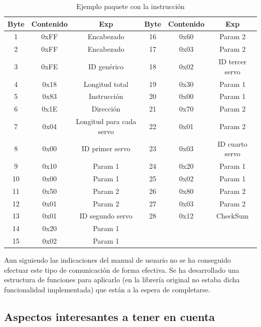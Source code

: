 		\begin{table}[htbp]
			\caption{Ejemplo paquete con la instrucción }
			\label{tab:syncwrite_paquet}
		 \begin{center}
				 	\begin{tabular}{|c|c|c||c|c|c|}

				 		\hline
				 		Byte & Contenido & Exp & Byte & Contenido & Exp \\
				 		\hline
				 		1 & 0xFF & Encabezado & 16 & 0x60 & Param 2 \\
				 		2 & 0xFF & Encabezado & 17 & 0x03 & Param 2 \\
				 		3 & 0xFE & ID genérico & 18 & 0x02 & ID tercer servo \\
				 		4 & 0x18 & Longitud total & 19 & 0x30 & Param 1 \\
				 		5 & 0x83 & Instrucción & 20 & 0x00 & Param 1 \\
				 		6 & 0x1E & Dirección & 21 & 0x70 & Param 2 \\
				 		7 & 0x04 & Longitud para cada servo & 22 & 0x01 & Param 2 \\
				 		8 & 0x00 & ID primer servo & 23 & 0x03 & ID cuarto servo \\
				 		9 & 0x10 & Param 1 & 24 & 0x20 & Param 1 \\
				 		10 & 0x00 & Param 1 & 25 & 0x02 & Param 1  \\
				 		11 & 0x50 & Param 2 & 26 & 0x80 & Param 2 \\
				 		12 & 0x01 & Param 2 & 27 & 0x03 & Param 2 \\
				 		13 & 0x01 & ID segundo servo & 28 & 0x12 & CheckSum \\
				 		14 & 0x20 & Param 1 &  &  & \\
				 		15 & 0x02 & Param 1 &  &  &   \\
				 		\hline
				 	\end{tabular}
		 \end{center}
		\end{table}

		Aun siguiendo las indicaciones del manual de usuario no se ha conseguido efectuar este tipo de comunicación de forma efectiva. Se ha desarrollado una estructura de funciones para aplicarlo (en la librería original no estaba dicha funcionalidad implementada) que están a la espera de completarse.

	\subsection{Aspectos interesantes a tener en cuenta}

